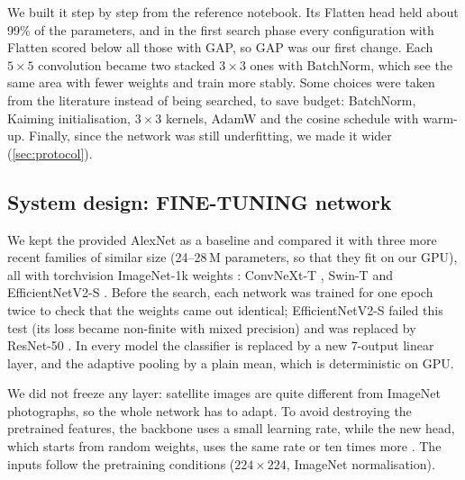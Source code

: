 We built it step by step from the reference notebook. Its Flatten head held about 99\% of the parameters, and in the first search phase every configuration with Flatten scored below all those with GAP, so GAP was our first change. Each $5\times5$ convolution became two stacked $3\times3$ ones with BatchNorm, which see the same area with fewer weights and train more stably. Some choices were taken from the literature instead of being searched, to save budget: BatchNorm, Kaiming initialisation, $3\times3$ kernels, AdamW and the cosine schedule with warm-up. Finally, since the network was still underfitting, we made it wider (\cref{sec:protocol}).

\subsection{System design: FINE-TUNING network}\label{sec:ft}
We kept the provided AlexNet \citep{krizhevsky2012alexnet} as a baseline and compared it with three more recent families of similar size (24--28\,M parameters, so that they fit on our GPU), all with torchvision ImageNet-1k weights \citep{russakovsky2015imagenet}: ConvNeXt-T \citep{liu2022convnext}, Swin-T \citep{liu2021swin} and EfficientNetV2-S \citep{tan2021efficientnetv2}. Before the search, each network was trained for one epoch twice to check that the weights came out identical; EfficientNetV2-S failed this test (its loss became non-finite with mixed precision) and was replaced by ResNet-50 \citep{he2016resnet}. In every model the classifier is replaced by a new 7-output linear layer, and the adaptive pooling by a plain mean, which is deterministic on GPU.

We did not freeze any layer: satellite images are quite different from ImageNet photographs, so the whole network has to adapt. To avoid destroying the pretrained features, the backbone uses a small learning rate, while the new head, which starts from random weights, uses the same rate or ten times more \citep{howard2018ulmfit}. The inputs follow the pretraining conditions ($224\times224$, ImageNet normalisation).

